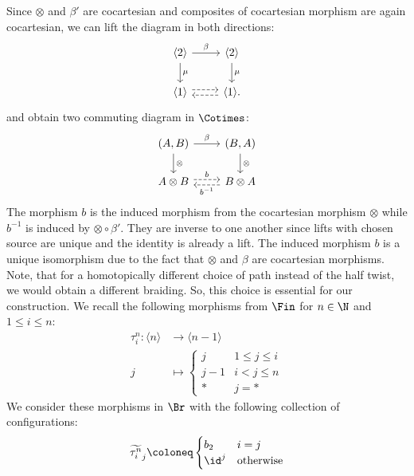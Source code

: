 Since $\otimes$ and $\beta'$ are cocartesian and composites of cocartesian morphism are again 
cocartesian, we can lift the diagram in both directions:
\[    
    \begin{tikzcd}
        \langle 2 \rangle \arrow[r, "\beta"] \arrow[d, "\mu"] & \langle 2 \rangle \arrow[d, "\mu"] \\
        \langle 1 \rangle  \arrow[r, dashed, shift left]                  & \langle 1 \rangle. \arrow[l, dashed, shift left]                
    \end{tikzcd}
\]
and obtain two commuting diagram in $\Cotimes$:
\[
\begin{tikzcd}
{(A,B)} \arrow[r, "\beta"] \arrow[d, "\otimes"] & {(B,A)} \arrow[d, "\otimes"]                        \\
A \otimes B \arrow[r, "b", dashed, shift left]  & B \otimes A \arrow[l, "b^{-1}", dashed, shift left]
\end{tikzcd}
\]
The morphism $b$ is the induced morphism from the cocartesian morphism $\otimes$ while $b^{-1}$ 
is induced by $\otimes \circ \beta'$. 
They are inverse to one another since lifts with chosen source are unique and the identity is already a lift.
The induced morphism $b$ is a unique isomorphism due to the fact that $\otimes$ and $\beta$ are cocartesian morphisms.
Note, that for a homotopically different choice of path instead of the half twist, we would obtain a
different braiding. So, this choice is essential for our construction.
We recall the following morphisms from $\Fin$ for $n \in \N$ and $1 \leq i \leq n$:
\begin{align*}
    \tau^n_i \colon \langle n \rangle &\to \langle n-1 \rangle \\
    j &\mapsto \begin{cases}
        j &  1 \leq j \leq i \\
        j-1 & i < j \leq n \\
        \ast & j=\ast
    \end{cases}
\end{align*}
We consider these morphisms in $\Br$ with the following collection of configurations:
\begin{align*}
    \widetilde{\tau^n_i}_j \coloneq
     \begin{cases}
        b_2 &   i=j \\
        \id^j & \text{otherwise}
    \end{cases}
\end{align*}

